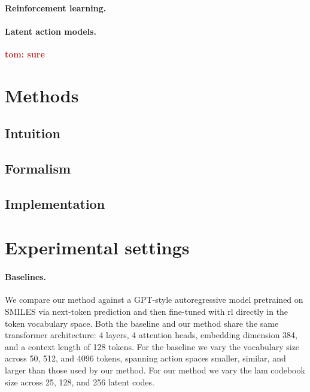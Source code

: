 \documentclass[10pt]{article} %
\newcommand{\tom}[1]{\textcolor{brown}{\textbf{tom: #1}}}
\newcommand{\tom}[1]{\textcolor{green}{\footnote{\textcolor{green}{\textbf{Tom: #1}}}}}
\begin{document}
\paragraph{Reinforcement learning.}


\paragraph{Latent action models.}
\tom{sure}



\section{Methods}
\subsection{Intuition}
\subsection{Formalism}
\subsection{Implementation}




\section{Experimental settings}

\paragraph{Baselines.}
We compare our method against a GPT-style autoregressive model pretrained on SMILES via next-token prediction and then fine-tuned with \gls{rl} directly in the token vocabulary space.
Both the baseline and our method share the same transformer architecture: 4 layers, 4 attention heads, embedding dimension 384, and a context length of 128 tokens.
For the baseline we vary the vocabulary size across 50, 512, and 4096 tokens, spanning action spaces smaller, similar, and larger than those used by our method.
For our method we vary the \gls{lam} codebook size across 25, 128, and 256 latent codes.
\end{document}
